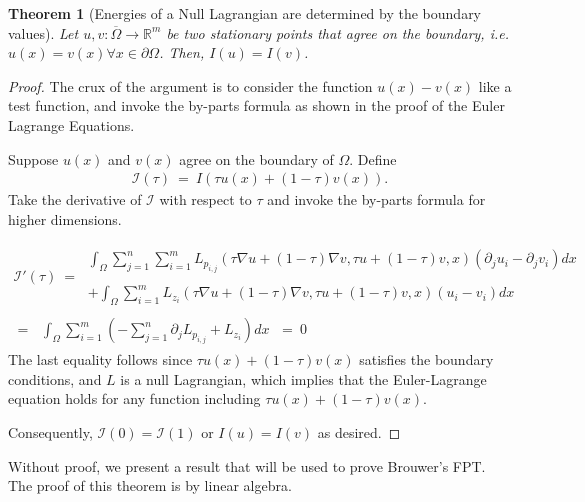 \documentclass[10pt]{article}
\numberwithin{equation}{section}
\newtheorem{theorem}{Theorem}
\numberwithin{theorem}{section}
\numberwithin{proposition}{section}
\numberwithin{lemma}{section}
\numberwithin{corollary}{section}
\numberwithin{remark}{section}
\numberwithin{definition}{section}
\numberwithin{example}{section}
\numberwithin{conjecture}{section}
\numberwithin{question}{section}
\begin{document}
\begin{theorem}[Energies of a Null Lagrangian are determined by the boundary values]
    Let $u, v: \overline \Omega \rightarrow \mathbb R^m$ be two stationary 
    points that agree on the boundary, i.e. $u(x) = v(x) \forall x \in \partial \Omega$. 
    Then, $I(u) = I(v)$. 
\end{theorem}
\begin{proof}
    The crux of the argument is to consider the function $u(x) - v(x)$ like a test 
    function, and invoke the by-parts formula as shown in the proof of the 
    Euler Lagrange Equations. 
    
    Suppose $u(x)$ and $v(x)$ agree on the boundary of $\Omega$. Define 
    \begin{align}
        \mathcal{I} (\tau) \ = \ I(\tau u(x) +(1 - \tau) v(x)).
    \end{align}
    Take the derivative of $\mathcal I$ with respect to $\tau$ and 
    invoke the by-parts formula for higher dimensions. 

    \begin{align}
        \mathcal I '(\tau) \ = \ 
        \begin{split}
        \int_\Omega 
        \sum_{j = 1}^n \sum_{i = 1}^m L_{p_{i, j}} (\tau \nabla u +
        (1- \tau) \nabla v, \tau u + (1- \tau) v, x) (\partial_ju_i - \partial_j v_i)dx \\ 
        \\ + 
        \int_{\Omega} \sum_{i=1}^m L_{z_i} (\tau \nabla u + (1 - \tau) \nabla v, 
        \tau u + (1-\tau) v, x) (u_i - v_i) dx
        \end{split} 
         \\ = \ \begin{split}
            \int_\Omega \sum_{i = 1}^m\left(
                -\sum_{j = 1}^n\partial_j L_{p_{i, j}} + L_{z_i}
            \right)dx
         \end{split} \ = \ 0
    \end{align}
    The last equality follows since $\tau u(x) + (1 - \tau)v(x)$ 
    satisfies the boundary conditions, and $L$ is a null Lagrangian, 
    which implies that the Euler-Lagrange equation holds for any function 
    including $\tau u(x) + (1 - \tau)v(x)$. 

    Consequently, $\mathcal I(0) = \mathcal I(1)$ or $I(u) = I(v)$ 
    as desired. 
\end{proof}

Without proof, we present a result that will be used to prove 
Brouwer's FPT. The proof of this theorem is by linear algebra. 
\end{document}
